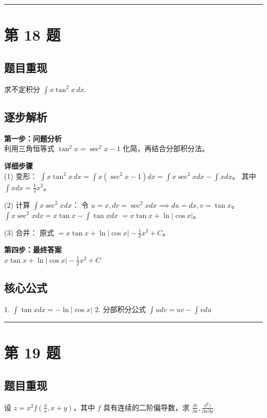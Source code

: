\documentclass[10pt, a4paper]{ctexart}
\newcommand{\problemheader}{
    \vspace{0.5cm}
    \noindent\rule[0.5ex]{\linewidth}{2pt} %
}
\newcommand{\analysisheader}{
    \vspace{0.2cm}
    \noindent{\color{red}\rule[0.5ex]{\linewidth}{0.5pt}} %
    \vspace{0.1cm}
}
\begin{document}
\problemheader
\section*{第 18 题}
\subsection*{题目重现}
求不定积分 $\int x \tan^2 x \, dx$.

\analysisheader
{\color{red}
\subsection*{逐步解析}
\textbf{第一步：问题分析} \\
利用三角恒等式 $\tan^2 x = \sec^2 x - 1$ 化简，再结合分部积分法。

\textbf{详细步骤} \\
(1) 变形：
$\int x \tan^2 x \, dx = \int x (\sec^2 x - 1) dx = \int x \sec^2 x dx - \int x dx$。
其中 $\int x dx = \frac{1}{2}x^2$。

(2) 计算 $\int x \sec^2 x dx$：
令 $u=x, dv=\sec^2 x dx \implies du=dx, v=\tan x$。
$\int x \sec^2 x dx = x \tan x - \int \tan x dx$
$= x \tan x + \ln|\cos x|$。

(3) 合并：
原式 $= x \tan x + \ln|\cos x| - \frac{1}{2}x^2 + C$。

\textbf{第四步：最终答案} \\
$x \tan x + \ln|\cos x| - \frac{1}{2}x^2 + C$

\subsection*{核心公式}
1. $\int \tan x dx = -\ln|\cos x|$
2. 分部积分公式 $\int u dv = uv - \int v du$
}

\problemheader
\section*{第 19 题}
\subsection*{题目重现}
设 $z = x^2 f\left(\frac{y}{x}, x+y\right)$，其中 $f$ 具有连续的二阶偏导数，求 $\frac{\partial z}{\partial x}, \frac{\partial^2 z}{\partial x \partial y}$.
\end{document}
